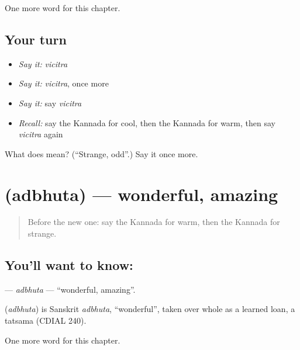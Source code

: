 \begin{grammarlens}[title={What you've built}]
One more word for this chapter.
\end{grammarlens}

\subsection*{Your turn}
\begin{itemize}
\raggedright
  \item \emph{Say it:} \emph{vicitra}
  \item \emph{Say it:} \emph{vicitra}, once more
  \item \emph{Say it:} say \emph{vicitra}
  \item \emph{Recall:} say the Kannada for cool, then the Kannada for warm, then say \emph{vicitra} again
\end{itemize}

\begin{tcolorbox}[breakable,colback=teal!4,colframe=teal!35!black,title={Before you move on}]
What does  mean? (\textquotedblleft{}Strange, odd\textquotedblright{}.) Say it once more.
\end{tcolorbox}
\section[\texorpdfstring{\kn{ಅದ್ಭುತ} (adbhuta)}{ಅದ್ಭುತ (adbhuta)}]{ (adbhuta) — wonderful, amazing}

\label{lesson:KA-C291-adbhuta}



\begin{quote}
Before the new one: say the Kannada for warm, then the Kannada for strange.
\end{quote}

\subsection*{You'll want to know: }
\textbf{} — \emph{adbhuta} — \textquotedblleft{}wonderful, amazing\textquotedblright{}.

\begin{cousinweb}
\textbf{} (\emph{adbhuta}) is Sanskrit \emph{adbhuta}, \textquotedblleft{}wonderful\textquotedblright{}, taken over whole as a learned loan, a tatsama (CDIAL 240).
\end{cousinweb}

\begin{grammarlens}[title={What you've built}]
One more word for this chapter.
\end{grammarlens}

